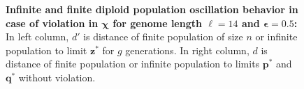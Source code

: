 \begin{figure}[h]
\begin{center}
\hspace{-3em}%
\vspace{-0.5em}  \hspace{-3em}%


\caption[\textbf{Infinite and finite diploid population oscillation behavior in case of violation in $\bm{\chi}$ for genome length $\ell = 14$ and $\bm{\epsilon} = 0.5$}]{\textbf{Infinite and finite diploid population oscillation behavior in case of violation in $\bm{\chi}$ for genome length $\ell = 14$ and $\bm{\epsilon} = 0.5$:} 
  In left column, $d'$ is distance of finite population of size $n$ or infinite population to limit $\bm{z}^\ast$ for $g$ generations. In right column, $d$ is distance of finite population or infinite population to limits $\bm{p}^\ast$ and $\bm{q}^\ast$ without violation.}
\label{oscillation_14d_vio_chi_0.5}
\end{center}
\end{figure}

